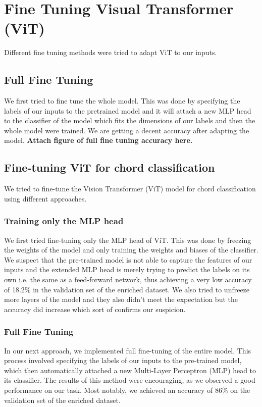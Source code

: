 \documentclass[10pt,twocolumn,letterpaper]{article}
\begin{document}
\section{Fine Tuning Visual Transformer (ViT)}
Different fine tuning methods were tried to adapt ViT to our inputs.
\subsection{Full Fine Tuning}
We first tried to fine tune the whole model. This was done by specifying the labels of our inputs to the pretrained model and it will attach a new MLP head to the classifier of the model which fits the dimensions of our labels and then the whole model were trained. We are getting a decent accuracy after adapting the model. \textbf{Attach figure of full fine tuning accuracy here.}
\subsection{Fine-tuning ViT for chord classification}
We tried to fine-tune the Vision Transformer (ViT) model for chord classification using different approaches.

\subsubsection{Training only the MLP head}
We first tried fine-tuning only the MLP head of ViT. This was done by freezing the weights of the model and only training the weights and biases of the classifier. We suspect that the pre-trained model is not able to capture the features of our inputs and the extended MLP head is merely trying to predict the labels on its own i.e. the same as a feed-forward network, thus achieving a very low accuracy of 18.2\% in the validation set of the enriched dataset. We also tried to unfreeze more layers of the model and they also didn't meet the expectation but the accuracy did increase which sort of confirms our suspicion.

\subsubsection{Full Fine Tuning}
In our next approach, we implemented full fine-tuning of the entire model. This process involved specifying the labels of our inputs to the pre-trained model, which then automatically attached a new Multi-Layer Perceptron (MLP) head to its classifier. The results of this method were encouraging, as we observed a good performance on our task. Most notably, we achieved an accuracy of 86\% on the validation set of the enriched dataset.
\end{document}
